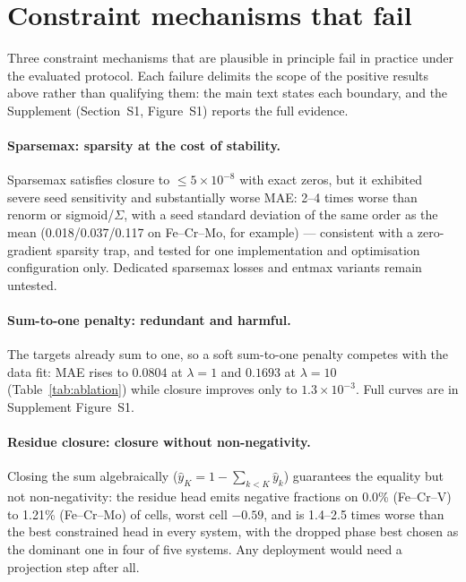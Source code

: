 \documentclass[preprint,12pt,authoryear]{elsarticle}
\begin{document}
\section{Constraint mechanisms that fail}
\label{sec:negative}

Three constraint mechanisms that are plausible in principle fail in
practice under the evaluated protocol. Each failure delimits the scope of
the positive results above rather than qualifying them: the main text
states each boundary, and the Supplement (Section~S1, Figure~S1) reports
the full evidence.

\paragraph{Sparsemax: sparsity at the cost of stability.}
Sparsemax \citep{martins2016sparsemax} satisfies closure to
$\le 5\times10^{-8}$ with exact zeros, but it exhibited severe seed
sensitivity and substantially worse MAE: 2--4 times worse than renorm or
sigmoid/$\Sigma$, with a seed standard deviation of the same order as the
mean (0.018/0.037/0.117 on Fe--Cr--Mo, for example) --- consistent with a
zero-gradient sparsity trap, and tested for one implementation and
optimisation configuration only. Dedicated sparsemax losses and entmax
variants remain untested.

\paragraph{Sum-to-one penalty: redundant and harmful.}
The targets already sum to one, so a soft sum-to-one penalty competes with
the data fit: MAE rises to $0.0804$ at $\lambda = 1$ and $0.1693$ at
$\lambda = 10$ (Table~\ref{tab:ablation}) while closure improves only to
$1.3\times10^{-3}$. Full curves are in Supplement Figure~S1.

\paragraph{Residue closure: closure without non-negativity.}
Closing the sum algebraically ($\hat y_K = 1 - \sum_{k<K} \hat y_k$)
guarantees the equality but not non-negativity: the residue head emits
negative fractions on 0.0\% (Fe--Cr--V) to 1.21\% (Fe--Cr--Mo) of cells,
worst cell $-0.59$, and is 1.4--2.5 times worse than the best constrained
head in every system, with the dropped phase best chosen as the dominant
one in four of five systems. Any deployment would need a projection step
after all.
\end{document}
